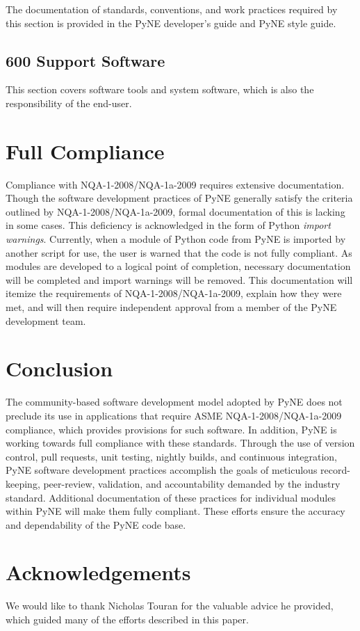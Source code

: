 \documentclass{anstrans}
\begin{document}
The documentation of standards, conventions, and work practices required by
this section is provided in the PyNE developer's guide and PyNE style guide.

\subsection{600 Support Software}
This section covers software tools and system software, which is also the responsibility of the end-user.

\section{Full Compliance}

Compliance with NQA-1-2008/NQA-1a-2009 requires extensive documentation.
Though the software development practices of PyNE generally satisfy the
criteria outlined by NQA-1-2008/NQA-1a-2009, formal documentation of this is
lacking in some cases. This deficiency is acknowledged in the form of Python \emph{import
warnings}. Currently, when a module of Python code from PyNE is imported by
another script for use, the user is warned that the code is not fully
compliant. As modules are developed to a logical point of completion, necessary
documentation will be completed and import warnings will be removed. 
This documentation will itemize the requirements of NQA-1-2008/NQA-1a-2009,
explain how they were met, and will then require independent approval from a
member of the PyNE development team.

\section{Conclusion}

The community-based software development model adopted by PyNE does not
preclude its use in applications that require ASME NQA-1-2008/NQA-1a-2009
compliance, which provides provisions for such software. In addition, PyNE is working towards full compliance with these standards.
Through the use of version control, pull requests, unit testing, nightly builds, and
continuous integration, PyNE software development practices accomplish the
goals of meticulous record-keeping, peer-review, validation, and accountability
demanded by the industry standard. Additional documentation of these practices for
individual modules within PyNE will make them fully compliant. These efforts ensure the accuracy and
dependability of the PyNE code base.

\section{Acknowledgements}

We would like to thank Nicholas Touran for the valuable advice he provided, which
guided many of the efforts described in this paper.



\end{document}
